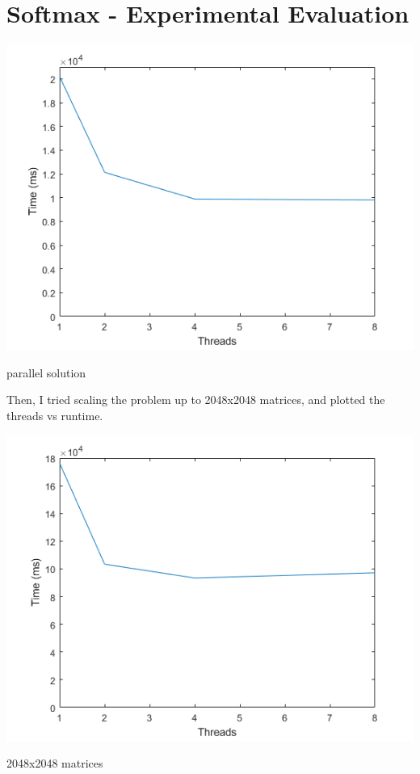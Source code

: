 \documentclass[a4paper]{article}
\begin{document}
\section{Softmax - Experimental Evaluation}

\begin{center}
    \includegraphics[scale=1]{7a.png}
    \caption{parallel solution}
\end{center}

\noindent
Then, I tried scaling the problem up to 2048x2048 matrices, and plotted the threads vs runtime.

\begin{center}
    \includegraphics[scale=1]{7b.png}
    \caption{2048x2048 matrices}
\end{center}
\end{document}
